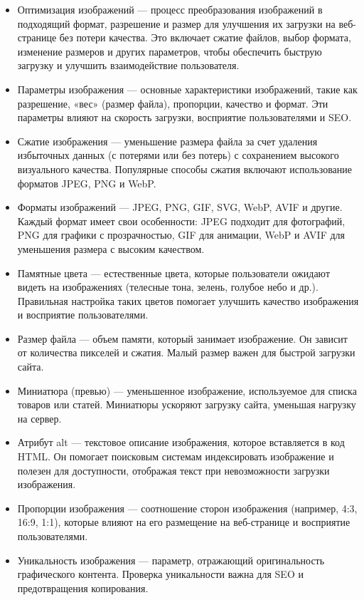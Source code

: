 \begin{itemize}
    \item Оптимизация изображений — процесс преобразования изображений в подходящий формат, разрешение и размер для улучшения их загрузки на веб-странице без потери качества. Это включает сжатие файлов, выбор формата, изменение размеров и других параметров, чтобы обеспечить быструю загрузку и улучшить взаимодействие пользователя.
    \item Параметры изображения — основные характеристики изображений, такие как разрешение, «вес» (размер файла), пропорции, качество и формат. Эти параметры влияют на скорость загрузки, восприятие пользователями и SEO.
    \item Сжатие изображения — уменьшение размера файла за счет удаления избыточных данных (с потерями или без потерь) с сохранением высокого визуального качества. Популярные способы сжатия включают использование форматов JPEG, PNG и WebP.
    \item Форматы изображений — JPEG, PNG, GIF, SVG, WebP, AVIF и другие. Каждый формат имеет свои особенности: JPEG подходит для фотографий, PNG для графики с прозрачностью, GIF для анимации, WebP и AVIF для уменьшения размера с высоким качеством.
    \item Памятные цвета — естественные цвета, которые пользователи ожидают видеть на изображениях (телесные тона, зелень, голубое небо и др.). Правильная настройка таких цветов помогает улучшить качество изображения и восприятие пользователями.
    \item Размер файла — объем памяти, который занимает изображение. Он зависит от количества пикселей и сжатия. Малый размер важен для быстрой загрузки сайта.
    \item Миниатюра (превью) — уменьшенное изображение, используемое для списка товаров или статей. Миниатюры ускоряют загрузку сайта, уменьшая нагрузку на сервер.
    \item Атрибут alt — текстовое описание изображения, которое вставляется в код HTML. Он помогает поисковым системам индексировать изображение и полезен для доступности, отображая текст при невозможности загрузки изображения.
    \item Пропорции изображения — соотношение сторон изображения (например, 4:3, 16:9, 1:1), которые влияют на его размещение на веб-странице и восприятие пользователями.
    \item Уникальность изображения — параметр, отражающий оригинальность графического контента. Проверка уникальности важна для SEO и предотвращения копирования.
\end{itemize}
\bigskip

